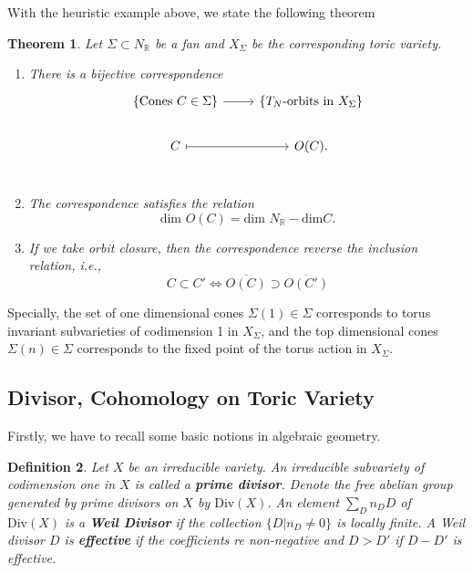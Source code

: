 \documentclass[11pt]{article}
\newtheorem{thm}{Theorem}[section]
\newtheorem{dfn}[thm]{Definition}
\newcommand{\reals}{\mathbb R}
\begin{document}
With the heuristic example above, we state the following theorem
\begin{thm}\label{corre}
Let $\Sigma\subset N_\reals$ be a fan and $X_{\Sigma}$ be the corresponding toric variety.
\begin{enumerate}[label=(\alph*)]
\item There is a bijective correspondence
	\[ \begin{tikzcd}
	\{\text{Cones }C\in \Sigma\}\arrow{r} & \{T_{N}\text{-orbits in }X_{\Sigma}\} \\
	C \arrow[r,mapsto]		& O(C). \\
	\end{tikzcd}\]
\item The correspondence satisfies the relation
	\begin{equation*}
		\text{dim } O(C)=\text{dim }N_{\reals}-\text{dim} C.
	\end{equation*}
\item If we take orbit closure, then the correspondence reverse the inclusion relation, i.e.,
	\begin{equation*}
		C\subset C'\Leftrightarrow \overline{O(C)}\supset \overline{O(C')}
	\end{equation*}
\end{enumerate}
\end{thm}
Specially, the set of one dimensional cones $\Sigma(1)\in \Sigma$ corresponds to torus invariant subvarieties of codimension 1 in $X_\Sigma$, and the top dimensional cones $\Sigma(n)\in\Sigma$ corresponds to the fixed point of the torus action in $X_\Sigma$.

\subsection{Divisor, Cohomology on Toric Variety}
Firstly, we have to recall some basic notions in algebraic geometry.
\begin{dfn}
	Let $X$ be an irreducible variety. An irreducible subvariety of codimension one in $X$ is called a \textbf{prime divisor}. Denote the free abelian group generated by prime divisors on $X$ by $\text{Div}(X)$. An element $\sum_D n_D D$ of $\text{Div}(X)$ is a \textbf{Weil Divisor} if the collection $\{D|n_D\neq 0\}$ is locally finite. A Weil divisor $D$ is \textbf{effective} if the coefficients re non-negative and $D>D'$ if $D-D'$ is effective. 
\end{dfn}
\end{document}
